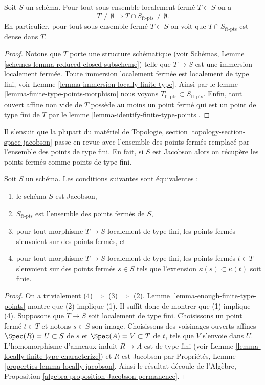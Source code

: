 \begin{lemma}
\label{lemma-enough-finite-type-points}
Soit $S$ un schéma.
Pour tout sous-ensemble localement fermé $T \subset S$ on a
$$
T \not = \emptyset
\Rightarrow
T \cap S_{\text{ft-pts}} \not = \emptyset.
$$
En particulier, pour tout sous-ensemble fermé $T \subset S$
on voit que $T \cap S_{\text{ft-pts}}$ est dense dans $T$.
\end{lemma}

\begin{proof}
Notons que $T$ porte une structure
schématique (voir Schémas, Lemme \ref{schemes-lemma-reduced-closed-subscheme}) telle
que $T \to S$ est une immersion localement
fermée. Toute immersion localement fermée
est localement de type fini, voir Lemme
\ref{lemma-immersion-locally-finite-type}. Ainsi par le lemme \ref{lemma-finite-type-points-morphism} nous
voyons $T_{\text{ft-pts}} \subset S_{\text{ft-pts}}$. Enfin, tout ouvert affine
non vide de $T$ possède au moins un point fermé
qui est un point de type fini de
$T$ par le lemme \ref{lemma-identify-finite-type-points}.
\end{proof}

\noindent
Il s'ensuit que la plupart du matériel de
Topologie, section \ref{topology-section-space-jacobson} passe en revue avec l'ensemble des points
fermés remplacé par l'ensemble des points de type fini. En
fait, si $S$
est Jacobson alors on récupère les points fermés comme
points de type fini.

\begin{lemma}
\label{lemma-jacobson-finite-type-points}
Soit $S$ un schéma. Les conditions suivantes sont équivalentes :
\begin{enumerate}
\item le schéma $S$ est Jacobson,
\item $S_{\text{ft-pts}}$ est l'ensemble des points fermés de $S$,
\item pour tout morphisme $T \to S$ localement de type fini, les points
fermés s'envoient sur des points fermés, et
\item pour tout morphisme $T \to S$ localement de type
fini, les points fermés $t \in T$ s'envoient sur des points fermés
$s \in S$ tels que l'extension $\kappa(s) \subset \kappa(t)$ soit finie.
\end{enumerate}
\end{lemma}

\begin{proof}
On a trivialement (4) $\Rightarrow$ (3) $\Rightarrow$ (2).
Lemme \ref{lemma-enough-finite-type-points} montre que (2) implique (1). Il suffit donc de
montrer que (1) implique (4). Supposons
que $T \to S$ soit localement de type fini.
Choisissons un point fermé $t \in T$ et notons $s \in S$
son image. Choisissons des voisinages ouverts affines $\Spec(R) = U \subset S$
de $s$ et $\Spec(A) = V \subset T$ de $t$, tels que
$V$ s'envoie dans $U$. L'homomorphisme
d'anneaux induit $R \to A$ est de type fini (voir Lemme
\ref{lemma-locally-finite-type-characterize}) et $R$ est Jacobson par Propriétés,
Lemme \ref{properties-lemma-locally-jacobson}. Ainsi
le résultat découle de l'Algèbre, Proposition \ref{algebra-proposition-Jacobson-permanence}.
\end{proof}

